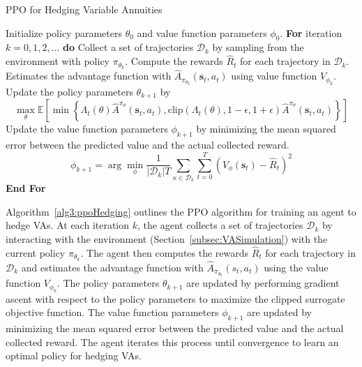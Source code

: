 \begin{algorithm} 
    \caption{PPO for Hedging Variable Annuities} 
    \begin{algorithmic}[1] \label{alg3:ppoHedging}
        \STATE  Initialize policy parameters $\theta_0$ and value function parameters $\phi_0$.
        \STATE  \textbf{For} {iteration $k=0, 1,2,\ldots$} \textbf{do}
        \STATE  \quad Collect a set of trajectories $\mathcal{D}_k$ by sampling from the environment with policy $\pi_{\theta_{k}}$.
        \STATE  \quad Compute the rewards $\hat{R}_t$ for each trajectory in $\mathcal{D}_k$.
        \STATE  \quad Estimates the advantage function with $\hat{A}_{\pi_{\theta_k}}(\mathbf{s}_t, a_t)$ using value function $V_{\phi_k}$.
        \STATE  \quad Update the policy parameters $\theta_{k+1}$ by 
        \begin{equation*}
            \max_{\theta} \mathbb{E}\left[ \min \left\{ \Lambda_t(\theta)\hat{A}^{\pi_{\theta}}(\mathbf{s}_t, a_t), \text{clip}(\Lambda_t(\theta), 1-\epsilon, 1 + \epsilon) \hat{A}^{\pi_{\theta}}(\mathbf{s}_t, a_t)  \right\} \right]
        \end{equation*}
        \STATE  \quad Update the value function parameters $\phi_{k+1}$ by minimizing the mean squared error between the predicted value and the actual collected reward.
        \begin{equation*}
            \phi_{k+1} = \arg \min_{\phi} \frac{1}{|\mathcal{D}_k|T} \sum_{\mathcal{\kappa} \in \mathcal{D}_k} \sum_{t=0}^{T} \left( V_{\phi}(\mathbf{s}_t) - \hat{R}_t \right)^2
        \end{equation*}
        \STATE  \textbf{End For}
    \end{algorithmic}
\end{algorithm}

Algorithm~\ref{alg3:ppoHedging} outlines the PPO algorithm for training an agent to hedge VAs.
At each iteration $k$, the agent collects a set of trajectories $\mathcal{D}_k$ by interacting with the environment (Section~\ref{subsec:VASimulation}) with the current policy $\pi_{\theta_k}$.
The agent then computes the rewards $\hat{R}_t$ for each trajectory in $\mathcal{D}_k$ and estimates the advantage function with $\hat{A}_{\pi_{\theta_k}}(s_t, a_t)$ using the value function $V_{\phi_k}$.
The policy parameters $\theta_{k+1}$ are updated by performing gradient ascent with respect to the policy parameters to maximize the clipped surrogate objective function.
The value function parameters $\phi_{k+1}$ are updated by minimizing the mean squared error between the predicted value and the actual collected reward.
The agent iterates this process until convergence to learn an optimal policy for hedging VAs.


